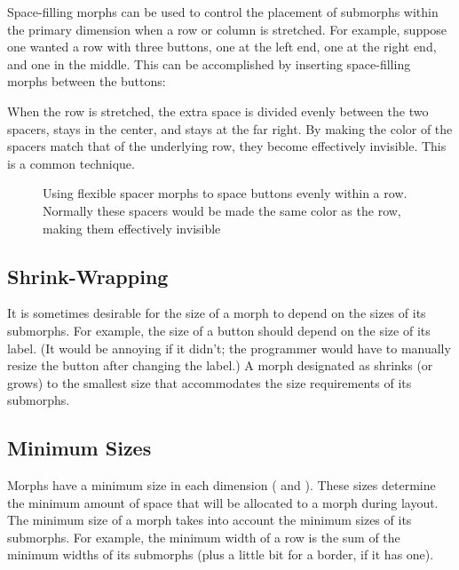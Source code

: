 \documentclass[letterpaper,10pt,english]{sphinxmanual}
\begin{document}
Space-filling morphs can be used to control the placement of submorphs within the primary dimension when a row or column is stretched. For example, suppose one wanted a row with three buttons, one at the left end, one at the right end, and one in the middle. This can be accomplished by inserting space-filling morphs between the buttons:

\begin{sphinxVerbatim}[commandchars=\\\{\}]
\end{sphinxVerbatim}

When the row is stretched, the extra space is divided evenly between the two spacers,  stays in the center, and  stays at the far right. By making the color of the spacers match that of the underlying row, they become effectively invisible. This is a common technique.
\begin{figure}[htbp]
\centering
\capstart

\noindent{}
\caption{Using flexible spacer morphs to space buttons evenly within a row. Normally these spacers would be made the same color as the row, making them effectively invisible}\label{\detokenize{morphic:id16}}\end{figure}


\subsection{Shrink-Wrapping}
\label{\detokenize{morphic:shrink-wrapping}}
It is sometimes desirable for the size of a morph to depend on the sizes of its submorphs. For example, the size of a button should depend on the size of its label. (It would be annoying if it didn't; the programmer would have to manually resize the button after changing the label.) A morph designated as  shrinks (or grows) to the smallest size that accommodates the size requirements of its submorphs.


\subsection{Minimum Sizes}
\label{\detokenize{morphic:minimum-sizes}}
Morphs have a minimum size in each dimension ( and ). These sizes determine the minimum amount of space that will be allocated to a morph during layout. The minimum size of a morph takes into account the minimum sizes of its submorphs. For example, the minimum width of a row is the sum of the minimum widths of its submorphs (plus a little bit for a border, if it has one).
\end{document}
